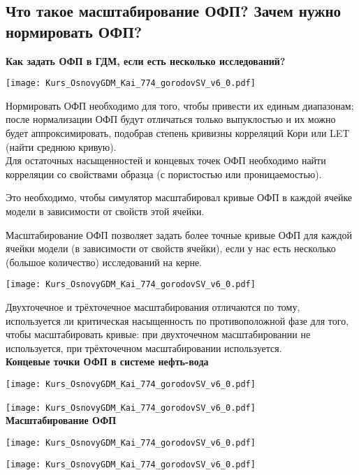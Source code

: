 

\subsection{Что такое масштабирование ОФП? Зачем нужно нормировать ОФП?}

\textbf{Как задать ОФП в ГДМ, если есть несколько исследований?}

\texttt{[image: Kurs\_OsnovyGDM\_Kai\_774\_gorodovSV\_v6\_0.pdf]}

Нормировать ОФП необходимо для того, чтобы привести их единым диапазонам; после нормализации ОФП будут отличаться только выпуклостью и их можно будет аппроксимировать, подобрав степень кривизны корреляций Кори или LET (найти среднюю кривую).
\\

Для остаточных насыщенностей и концевых точек ОФП необходимо найти корреляции со свойствами образца (с пористостью или проницаемостью).

Это необходимо, чтобы симулятор масштабировал кривые ОФП в каждой ячейке модели в зависимости от свойств этой ячейки.

Масштабирование ОФП позволяет задать более точные кривые ОФП для каждой ячейки модели (в зависимости от свойств ячейки), если у нас есть несколько (большое количество) исследований на керне.

\texttt{[image: Kurs\_OsnovyGDM\_Kai\_774\_gorodovSV\_v6\_0.pdf]}

Двухточечное и трёхточечное масштабирования отличаются по тому, используется ли критическая насыщенность по противоположной фазе для того, чтобы масштабировать кривые: при двухточечном масштабировании не используется, при трёхточечном масштабировании используется.
\\

\textbf{Концевые точки ОФП в системе нефть-вода}

\texttt{[image: Kurs\_OsnovyGDM\_Kai\_774\_gorodovSV\_v6\_0.pdf]}

\texttt{[image: Kurs\_OsnovyGDM\_Kai\_774\_gorodovSV\_v6\_0.pdf]}
\ \\

\textbf{Масштабирование ОФП}

\texttt{[image: Kurs\_OsnovyGDM\_Kai\_774\_gorodovSV\_v6\_0.pdf]}

\texttt{[image: Kurs\_OsnovyGDM\_Kai\_774\_gorodovSV\_v6\_0.pdf]}

